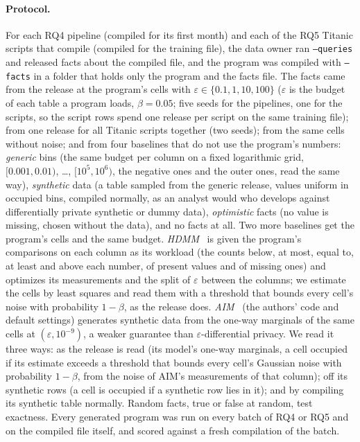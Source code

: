 \paragraph{Protocol.} For each RQ4 pipeline (compiled for its first month) and each of the
\PrivTitanicScripts{} RQ5 Titanic scripts that compile (compiled for the training file), the data owner
ran \texttt{--queries} and released facts about the compiled file, and the program was compiled with
\texttt{--facts} in a folder that holds only the program and the facts file. The facts came from the
release at the program's cells with $\varepsilon \in \{0.1, 1, 10, 100\}$ ($\varepsilon$ is the budget of
each table a program loads, $\beta = 0.05$; five seeds for the pipelines, one for the scripts, so the
script rows spend one release per script on the same training file); from one release
for all Titanic scripts together (two seeds); from the same cells without noise; and from four baselines
that do not use the program's numbers: \emph{generic} bins (the same budget per column on a fixed
logarithmic grid, $[0.001, 0.01)$, \ldots, $[10^5, 10^6)$, the negative ones and the outer ones, read the
same way), \emph{synthetic} data (a table sampled from the generic release, values uniform in occupied
bins, compiled normally, as an analyst would who develops against differentially private synthetic or
dummy data), \emph{optimistic} facts (no value is missing, chosen without the data), and no facts at all.
Two more baselines get the program's cells and the same budget. \emph{HDMM}~\cite{mckenna2018hdmm} is given
the program's comparisons on each column as its workload (the counts below, at most, equal to, at least and
above each number, of present values and of missing ones) and optimizes its measurements and the split of
$\varepsilon$ between the columns; we estimate the cells by least squares and read them with a threshold
that bounds every cell's noise with probability $1-\beta$, as the release does. \emph{AIM}~\cite{mckenna2022aim}
(the authors' code and default settings) generates synthetic data from the one-way marginals of the same
cells at $(\varepsilon, 10^{-9})$, a weaker guarantee than $\varepsilon$-differential privacy. We read it
three ways: as the release is read (its model's one-way marginals, a cell occupied if its estimate exceeds a
threshold that bounds every cell's Gaussian noise with probability $1-\beta$, from the noise of AIM's
measurements of that column); off its synthetic rows (a cell is occupied if a synthetic row lies in it);
and by compiling its synthetic table normally.
Random facts, true or false at random, test exactness. Every generated program was run on every batch of
RQ4 or RQ5 and on the compiled file itself, and scored against a fresh compilation of the batch.

